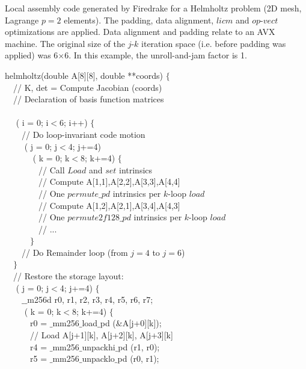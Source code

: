 \documentclass[conference]{IEEEtran}
\begin{document}
\begin{algorithm}[t]
\small
\caption{Local assembly code generated by Firedrake for a Helmholtz problem (2D mesh, Lagrange $p=2$ elements). The padding, data alignment, $licm$ and $op$-$vect$ optimizations are applied. Data alignment and padding relate to an AVX machine. The original size of the $j$-$k$ iteration space (i.e. before padding was applied) was 6$\times$6. In this example, the unroll-and-jam factor is 1.}
\label{code:helmholtz-opvect}
 helmholtz(double A[8][8], double **coords) $\lbrace$\\
~~// K, det = Compute Jacobian (coords) \\
~~// Declaration of basis function matrices \\
~~\\
~~ ( i = 0; i$<$6; i++) $\lbrace$ \\
~~~~// Do loop-invariant code motion \\
~~~~ ( j = 0; j$<$4; j+=4) \\
~~~~~~ ( k = 0; k$<$8; k+=4) $\lbrace$\\
~~~~~~~~// Call $Load$ and $set$ intrinsics \\
~~~~~~~~// Compute A[1,1],A[2,2],A[3,3],A[4,4] \\
~~~~~~~~// One $permute\_pd$ intrinsics per $k$-loop $load$\\
~~~~~~~~// Compute A[1,2],A[2,1],A[3,4],A[4,3] \\
~~~~~~~~// One $permute2f128\_pd$ intrinsics per $k$-loop $load$\\
~~~~~~~~// ...\\
~~~~~~$\rbrace$\\
~~~~// Do Remainder loop (from $j=4$ to $j=6$)\\
~~$\rbrace$\\
~~// Restore the storage layout:\\
~~ ( j = 0; j$<$4; j+=4) $\lbrace$\\
~~~~$\_\_$m256d r0, r1, r2, r3, r4, r5, r6, r7;\\
~~~~ ( k = 0; k$<$8; k+=4) $\lbrace$\\
~~~~~~r0 = $\_$mm256$\_$load$\_$pd ($\&$A[j+0][k]);\\
~~~~~~// Load A[j+1][k], A[j+2][k], A[j+3][k]\\
~~~~~~r4 = $\_$mm256$\_$unpackhi$\_$pd (r1, r0);\\
~~~~~~r5 = $\_$mm256$\_$unpacklo$\_$pd (r0, r1);\\

\end{algorithm}
\end{document}
